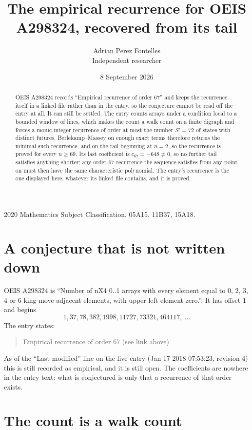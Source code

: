 \documentclass[11pt,a4paper]{article}
\title{The empirical recurrence for OEIS A298324, recovered from its tail}
\author{Adrian Perez Fontelles\\ \small Independent researcher}
\date{8 September 2026}
\theoremstyle{plain}
\theoremstyle{definition}
\begin{document}
\maketitle

\begin{abstract}
OEIS A298324 records ``Empirical recurrence of order $67$'' and keeps the recurrence itself in
a linked file rather than in the entry, so the conjecture cannot be read off the entry at all.
It can still be settled. The entry counts arrays under a condition local to a bounded window of
lines, which makes the count a walk count on a finite digraph and forces a monic integer
recurrence of order at most the number $S'=72$ of states with distinct futures. Berlekamp--Massey on
enough exact terms therefore returns the minimal such recurrence, and on the tail beginning at $n=2$, so the recurrence is proved for every $n\ge69$.
Its last coefficient is $c_{67}=-648\neq0$, so no further tail satisfies anything
shorter; any order-$67$ recurrence the sequence satisfies from any point on must then have
the same characteristic polynomial. The entry's recurrence is the one displayed here, whatever
its linked file contains, and it is proved.
\end{abstract}

\noindent\small 2020 Mathematics Subject Classification. 05A15, 11B37, 15A18.\normalsize

\section{A conjecture that is not written down}

OEIS A298324 is ``Number of nX4 0..1 arrays with every element equal to 0, 2, 3, 4 or 6 king-move adjacent elements, with upper left element zero.''. It has offset $1$ and begins
\[
1, 37, 78, 382, 1998, 11727, 73321, 464117,\ \dots
\]
The entry states:
\begin{quote}
Empirical recurrence of order 67 (see link above)
\end{quote}
As of the ``Last modified'' line on the live entry (Jan 17 2018 07:53:23, revision 4)
this is still recorded as empirical, and it is still open. The coefficients are nowhere in the
entry text: what is conjectured is only that a recurrence of that order exists.

\section{The count is a walk count}
\end{document}
